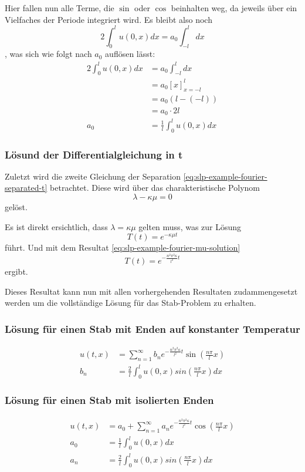 Hier fallen nun alle Terme, die $\sin$ oder $\cos$ beinhalten weg, da jeweils
über ein Vielfaches der Periode integriert wird.
Es bleibt also noch
\[
    2\int_{0}^{l}u(0, x)dx
    =
    a_0 \int_{-l}^{l}dx
\]
, was sich wie folgt nach $a_0$ auflösen lässt:
\[
\begin{aligned}
    2\int_{0}^{l}u(0, x)dx
    &=
    a_0 \int_{-l}^{l}dx
    \\
    &=
    a_0 \left[x\right]_{x=-l}^{l}
    \\
    &=
    a_0(l - (-l))
    \\
    &=
    a_0 \cdot 2l
    \\
    a_0
    &=
    \frac{1}{l} \int_{0}^{l}u(0, x)dx
\end{aligned}
\]

%
%

\subsubsection{Lösund der Differentialgleichung in t}
Zuletzt wird die zweite Gleichung der Separation
\eqref{eq:slp-example-fourier-separated-t} betrachtet.
Diese wird über das charakteristische Polynom
\[
    \lambda - \kappa \mu
    =
    0
\]
gelöst.

Es ist direkt ersichtlich, dass $\lambda = \kappa \mu$ gelten muss, was zur
Lösung
\[
    T(t)
    =
    e^{-\kappa \mu t}
\]
führt.
Und mit dem Resultat \eqref{eq:slp-example-fourier-mu-solution}
\[
    T(t)
    =
    e^{-\frac{n^{2}\pi^{2}\kappa}{l^{2}}t}
\]
ergibt.

Dieses Resultat kann nun mit allen vorhergehenden Resultaten zudammengesetzt
werden um die vollständige Lösung für das Stab-Problem zu erhalten.

\subsubsection{Lösung für einen Stab mit Enden auf konstanter Temperatur}
\[
\begin{aligned}
    u(t,x)
    &=
    \sum_{n=1}^{\infty}b_{n}e^{-\frac{n^{2}\pi^{2}\kappa}{l^{2}}t}
    \sin\left(\frac{n\pi}{l}x\right)
    \\
    b_{n}
    &=
    \frac{2}{l}\int_{0}^{l}u(0,x)sin\left(\frac{n\pi}{l}x\right) dx
\end{aligned}
\]

\subsubsection{Lösung für einen Stab mit isolierten Enden}
\[
\begin{aligned}
    u(t,x)
    &=
    a_{0} + \sum_{n=1}^{\infty}a_{n}e^{-\frac{n^{2}\pi^{2}\kappa}{l^{2}}t}
    \cos\left(\frac{n\pi}{l}x\right)
    \\
    a_{0}
    &=
    \frac{1}{l}\int_{0}^{l}u(0,x) dx
    \\
    a_{n}
    &=
    \frac{2}{l}\int_{0}^{l}u(0,x)sin\left(\frac{n\pi}{l}x\right) dx
\end{aligned}
\]

